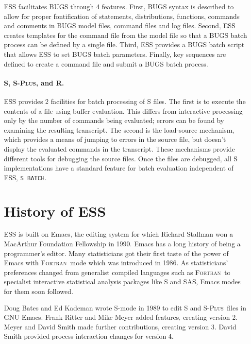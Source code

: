 \documentclass{article}
\newcommand*{\SAS}{\textsc{SAS}}
\newcommand*{\Splus}{\textsc{S-Plus}}
\newcommand*{\Fortran}{\textsc{Fortran}}
\newcommand{\stexttt}[1]{{\small\texttt{#1}}}
\begin{document}
ESS facilitates BUGS %
through 4 features.
First, BUGS syntax is described to allow for proper fontification
of statements, distributions, functions, commands and comments in BUGS
model files, command files and log files.  Second, ESS creates
templates for the command file from the model file so that a BUGS
batch process can be defined by a single file.  Third, ESS provides
a BUGS batch script that allows ESS to set BUGS batch parameters.
Finally, key sequences are defined to create a command file and submit 
a BUGS batch process.

\paragraph{S, \Splus, and R.}
ESS provides 2 facilities for batch processing of S files.  The first
is to execute the contents of a file using buffer-evaluation.  This
differs from interactive processing only by the number of commands
being evaluated; errors can be found by examining the resulting
transcript.  The second is the load-source mechanism, which provides a
means of jumping to errors in the source file, but doesn't display the
evaluated commands in the transcript.  These mechanisms provide
different tools for debugging the source files.  Once the files are
debugged, all S implementations have a standard feature for batch
evaluation independent of ESS, \stexttt{S BATCH}.

\section{History of ESS}
\label{sec:ESS:history}

ESS is built on Emacs, the editing system for which Richard Stallman 
won a MacArthur Foundation Fellowship in 1990.  Emacs has a long history 
of being a programmer's editor.  Many statisticians got their first taste 
of the power of Emacs with \Fortran\ mode which was introduced in 1986.  
As statisticians' preferences changed from generalist compiled 
languages such as \Fortran\ to specialist interactive statistical analysis 
packages like S and \SAS, Emacs modes for them soon followed.

Doug Bates and Ed Kademan wrote S-mode in 1989 to edit S and \Splus\ files 
in GNU Emacs.  Frank Ritter and Mike Meyer added features, creating version 2.
Meyer and David Smith made further contributions, creating version 3.  David 
Smith provided process interaction changes for version 4.
\end{document}

